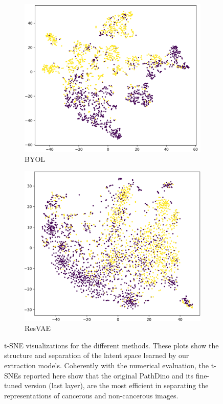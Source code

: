 \documentclass[peerreview]{IEEEtran}
\begin{document}
\begin{figure}[ht]
    \vspace{0.5em} %
    \hfill
    \begin{subfigure}[b]{0.3\textwidth}
        \includegraphics[width=\textwidth]{figure/BYOL_tsne.png}
        \caption{BYOL}
        \label{fig:tsne_byol}
    \end{subfigure}
    \hfill
    \begin{subfigure}[b]{0.3\textwidth}
        \includegraphics[width=\textwidth]{figure/tsne_resvae.png}
        \caption{ResVAE}
        \label{fig:tsne_resvae}
    \end{subfigure}
    \hfill 
    \hfill

    \caption{ \small t-SNE visualizations for the different methods. These plots show the structure and separation of the latent space learned by our extraction models. Coherently with the numerical evaluation, the t-SNEs reported here show that the original PathDino and its fine-tuned version (last layer), are the most efficient in separating the representations of cancerous and non-cancerous images.}
    \label{fig:tsne}
\end{figure}
\end{document}
